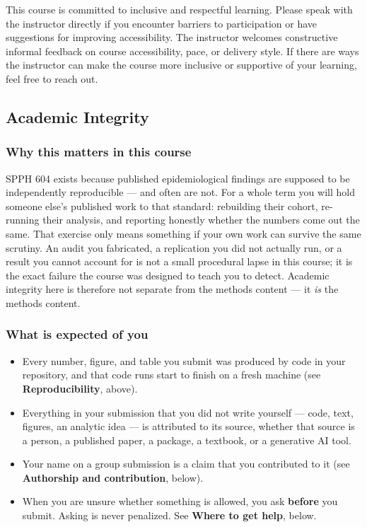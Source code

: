 \documentclass[
]{article}
\providecommand{\tightlist}{%
  \setlength{\itemsep}{0pt}\setlength{\parskip}{0pt}}
\begin{document}
This course is committed to inclusive and respectful learning. Please
speak with the instructor directly if you encounter barriers to
participation or have suggestions for improving accessibility. The
instructor welcomes constructive informal feedback on course
accessibility, pace, or delivery style. If there are ways the instructor
can make the course more inclusive or supportive of your learning, feel
free to reach out.

\subsection{Academic Integrity}\label{academic-integrity}

\subsubsection{Why this matters in this
course}\label{why-this-matters-in-this-course}

SPPH 604 exists because published epidemiological findings are supposed
to be independently reproducible --- and often are not. For a whole term
you will hold someone else's published work to that standard: rebuilding
their cohort, re-running their analysis, and reporting honestly whether
the numbers come out the same. That exercise only means something if
your own work can survive the same scrutiny. An audit you fabricated, a
replication you did not actually run, or a result you cannot account for
is not a small procedural lapse in this course; it is the exact failure
the course was designed to teach you to detect. Academic integrity here
is therefore not separate from the methods content --- it \emph{is} the
methods content.

\subsubsection{What is expected of you}\label{what-is-expected-of-you}

\begin{itemize}
\tightlist
\item
  Every number, figure, and table you submit was produced by code in
  your repository, and that code runs start to finish on a fresh machine
  (see \textbf{Reproducibility}, above).
\item
  Everything in your submission that you did not write yourself ---
  code, text, figures, an analytic idea --- is attributed to its source,
  whether that source is a person, a published paper, a package, a
  textbook, or a generative AI tool.
\item
  Your name on a group submission is a claim that you contributed to it
  (see \textbf{Authorship and contribution}, below).
\item
  When you are unsure whether something is allowed, you ask
  \textbf{before} you submit. Asking is never penalized. See
  \textbf{Where to get help}, below.
\end{itemize}
\end{document}
